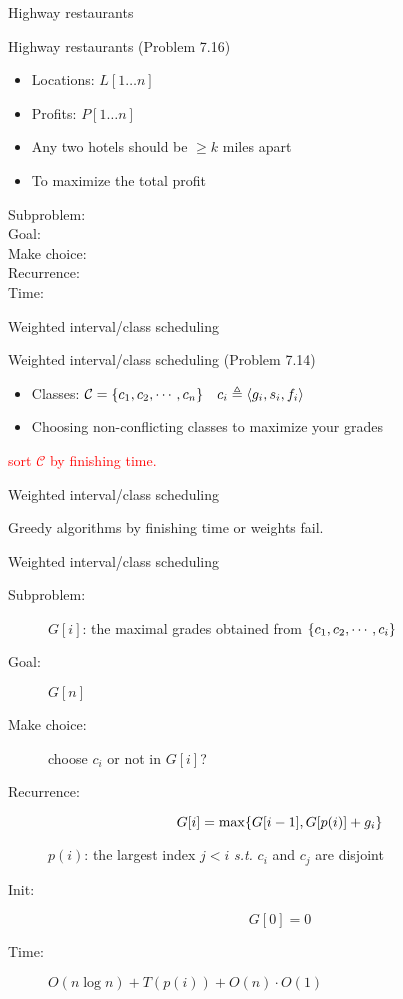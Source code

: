 \begin{frame}{Highway restaurants}
  \begin{exampleblock}{Highway restaurants (Problem 7.16)}
	\begin{itemize}
	  \item Locations: $L[1 \dots n]$
	  \item Profits: $P[1 \dots n]$
	  \item Any two hotels should be $\ge k$ miles apart
	  \item To maximize the total profit
	\end{itemize}
  \end{exampleblock}

  \begin{description}
	\item[Subproblem:]
	\item[Goal:] 
	\item[Make choice:] 
	\item[Recurrence:] 
	\item[Time:] 
  \end{description}
\end{frame}
\begin{frame}{Weighted interval/class scheduling}
  \begin{exampleblock}{Weighted interval/class scheduling (Problem 7.14)}
    \begin{itemize}
      \item Classes: $\mathcal{C} = \{c_{1}, c_{2}, \cdots, c_{n}\} \quad c_{i} \triangleq \langle g_{i}, s_{i}, f_{i} \rangle$
      \item Choosing non-conflicting classes to maximize your grades
    \end{itemize}
  \end{exampleblock}

  \centerline{\textcolor{red}{sort $\mathcal{C}$ by finishing time.}}
\end{frame}
\begin{frame}{Weighted interval/class scheduling}
  \centerline{Greedy algorithms by finishing time or weights fail.}
\end{frame}
\begin{frame}{Weighted interval/class scheduling}
  \begin{description}
	\item[Subproblem:] $G[i]$: the maximal grades obtained from $\{c_{1}, c_{2}, \cdots, c_{i}\}$
	\item[Goal:] $G[n]$
	  \pause
	\item[Make choice:] choose $c_{i}$ or not in $G[i]$?  
	\item[Recurrence:] 
	  \[
		G[i] = \max \{G[i-1], G[p(i)] + g_{i}\}
	  \]

	  $p(i)$: the largest index $j < i$ \emph{s.t.} $c_{i}$ and $c_{j}$ are disjoint
	  \pause
	\item[Init:]
	  \[
		G[0] = 0
	  \]
	  \pause
	\item[Time:] $O(n \log n) + T(p(i)) + O(n) \cdot O(1)$
  \end{description}
\end{frame}
